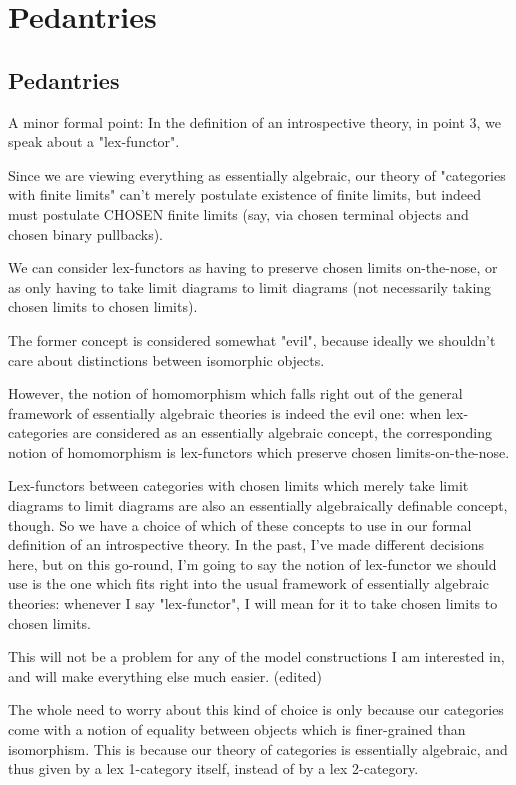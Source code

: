 \section{Pedantries}

\subsection{Pedantries}
A minor formal point: In the definition of an introspective theory, in point 3, we speak about a "lex-functor".

Since we are viewing everything as essentially algebraic, our theory of "categories with finite limits" can't merely postulate existence of finite limits, but indeed must postulate CHOSEN finite limits (say, via chosen terminal objects and chosen binary pullbacks).

We can consider lex-functors as having to preserve chosen limits on-the-nose, or as only having to take limit diagrams to limit diagrams (not necessarily taking chosen limits to chosen limits).

The former concept is considered somewhat "evil", because ideally we shouldn't care about distinctions between isomorphic objects.

However, the notion of homomorphism which falls right out of the general framework of essentially algebraic theories is indeed the evil one: when lex-categories are considered as an essentially algebraic concept, the corresponding notion of homomorphism is lex-functors which preserve chosen limits-on-the-nose.

Lex-functors between categories with chosen limits which merely take limit diagrams to limit diagrams are also an essentially algebraically definable concept, though.
So we have a choice of which of these concepts to use in our formal definition of an introspective theory.
In the past, I've made different decisions here, but on this go-round, I'm going to say the notion of lex-functor we should use is the one which fits right into the usual framework of essentially algebraic theories: whenever I say "lex-functor", I will mean for it to take chosen limits to chosen limits.

This will not be a problem for any of the model constructions I am interested in, and will make everything else much easier. (edited) 

The whole need to worry about this kind of choice is only because our categories come with a notion of equality between objects which is finer-grained than isomorphism. This is because our theory of categories is essentially algebraic, and thus given by a lex 1-category itself, instead of by a lex 2-category.

